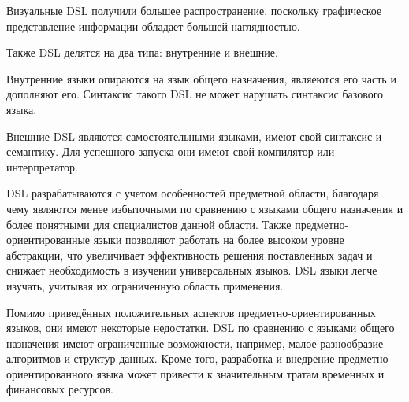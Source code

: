 Визуальные DSL получили большее распространение, поскольку графическое представление информации обладает большей наглядностью.

Также DSL делятся на два типа: внутренние и внешние.

Внутренние языки опираются на язык общего назначения, являеются его часть и дополняют его.
Синтаксис такого DSL не может нарушать синтаксис базового языка.

Внешние DSL являются самостоятельными языками, имеют свой синтаксис и семантику.
Для успешного запуска они имеют свой компилятор или интерпретатор.

DSL разрабатываются с учетом особенностей предметной области,
благодаря чему являются менее избыточными по сравнению с языками общего назначения и более понятными для специалистов данной области.
Также предметно-ориентированные языки позволяют работать на более высоком уровне абстракции,
что увеличивает эффективность решения поставленных задач и снижает необходимость в изучении универсальных языков.
DSL языки легче изучать, учитывая их ограниченную область применения.

Помимо приведённых положительных аспектов предметно-ориентированных языков, они имеют некоторые недостатки.
DSL по сравнению с языками общего назначения имеют ограниченные возможности, например, малое разнообразие алгоритмов и структур данных.
Кроме того, разработка и внедрение предметно-ориентированного языка может привести к значительным тратам временных и финансовых ресурсов.

